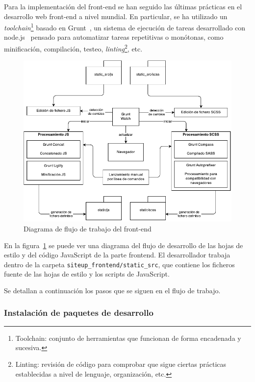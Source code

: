 Para la implementación del front-end se han seguido las últimas prácticas en el
desarrollo web front-end a nivel mundial. En particular, se ha utilizado un
\textit{toolchain}\footnote{Toolchain: conjunto de herramientas que funcionan de
  forma encadenada y sucesiva.} basado en Grunt~\cite{grunt}, un sistema de
ejecución de tareas desarrollado con node.js~\cite{nodejs} pensado para
automatizar tareas repetitivas o monótonas, como minificación, compilación,
testeo, \textit{linting}\footnote{Linting: revisión de código para comprobar que
  sigue ciertas prácticas establecidas a nivel de lenguaje, organización, etc.},
etc.

\begin{figure}[hbtp]
  \centering
  \includegraphics[width=\textwidth]{5_diseno/diagrama-frontend}
  \caption{Diagrama de flujo de trabajo del front-end}
  \label{fig:frontend}
\end{figure}

En la figura~\ref{fig:frontend} se puede ver una diagrama del flujo de
desarrollo de las hojas de estilo y del código JavaScript de la parte
frontend. El desarrollador trabaja dentro de la carpeta
\texttt{siteup\_frontend/static\_src}, que contiene los ficheros fuente de las
hojas de estilo y los scripts de JavaScript.

Se detallan a continuación los pasos que se siguen en el flujo de trabajo.

\subsubsection{Instalación de paquetes de desarrollo}

